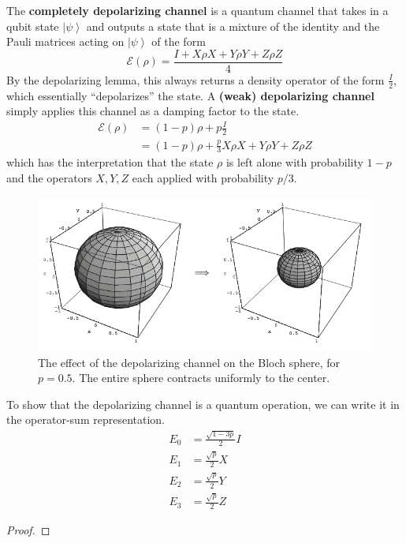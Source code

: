 \documentclass{article}
\newcommand{\ket}[1]{\ensuremath{\left|#1\right\rangle}}
\begin{document}
    \begin{definition}
      The \textbf{completely depolarizing channel} is a quantum channel that takes in a qubit state $\ket{\psi}$ and outputs a state that is a mixture of the identity and the Pauli matrices acting on $\ket{\psi}$ of the form 
      \begin{equation}
        \mathcal{E}(\rho) = \frac{I + X \rho X + Y \rho Y + Z \rho Z}{4}
      \end{equation}
      By the depolarizing lemma, this always returns a density operator of the form $\frac{I}{2}$, which essentially ``depolarizes'' the state. A \textbf{(weak) depolarizing channel} simply applies this channel as a damping factor to the state. 
      \begin{align}
        \mathcal{E}(\rho) & = (1 - p) \rho + p \frac{I}{2} \\
                          & = (1 - p) \rho + \frac{p}{3} X \rho X + Y \rho Y + Z \rho Z
      \end{align}
      which has the interpretation that the state $\rho$ is left alone with probability $1 - p$ and the operators $X, Y, Z$ each applied with probability $p/3$. 
      \begin{figure}[H]
        \centering 
        \includegraphics[scale=0.4]{img/depolarizing_channel.png}
        \caption{The effect of the depolarizing channel on the Bloch sphere, for $p = 0.5$. The entire sphere contracts uniformly to the center. } 
        \label{fig:depolarizing_channel}
      \end{figure}
    \end{definition}

    \begin{lemma}
      To show that the depolarizing channel is a quantum operation, we can write it in the operator-sum representation. 
      \begin{align}
        E_0 & = \frac{\sqrt{1 - 3p}}{2} I \\
        E_1 & = \frac{\sqrt{p}}{2} X \\ 
        E_2 & = \frac{\sqrt{p}}{2} Y \\ 
        E_3 & = \frac{\sqrt{p}}{2} Z 
      \end{align}
    \end{lemma}
    \begin{proof}
      
    \end{proof}
\end{document}
